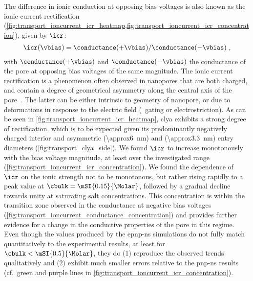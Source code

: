 The difference in ionic conduction at opposing bias voltages is also known as the ionic current rectification
(\cref{fig:transport_ioncurrent_icr_heatmap,fig:transport_ioncurrent_icr_concentration}), given by $\icr$:
%
\begin{align}\label{eq:icr}
  \icr(\vbias) = \conductance(+\vbias) / \conductance(-\vbias)
  \text{ ,}
\end{align}
%
with $\conductance(+\vbias)$ and $\conductance(-\vbias)$ the conductance of the pore at opposing bias voltages
of the same magnitude. The ionic current rectification is a phenomenon often observed in nanopores that are
both charged, and contain a degree of geometrical asymmetry along the central axis of the
pore~\cite{Constantin-2007,White-2008,Wang-2014}. The latter can be either intrinsic to geometry of nanopore,
or due to deformations in response to the electric field (\ie~gating or electrostriction). As can be seen in
\cref{fig:transport_ioncurrent_icr_heatmap}, \gls{clya} exhibits a strong degree of rectification, which is to
be expected given its predominantly negatively charged interior and asymmetric \cisi{} (\SI{\approx6}{\nm})
and \transi{} (\SI{\approx3.3}{\nm}) entry diameters (\cref{fig:transport_clya_side}). We found $\icr$ to
increase monotonously with the bias voltage magnitude, at least over the investigated range
(\cref{fig:transport_ioncurrent_icr_concentration}). We found the dependence of $\icr$ on the ionic strength
not to be monotonous, but rather rising rapidly to a peak value at $\cbulk=\mSI{0.15}{\Molar}$, followed by a
gradual decline towards unity at saturating salt concentrations. This concentration is within the transition
zone observed in the conductance at negative bias voltages
(\cref{fig:transport_ioncurrent_conductance_concentration}) and provides further evidence for a change in the
conductive properties of the pore in this regime. Even though the values produced by the \gls{epnp-ns}
simulations do not fully match quantitatively to the experimental results, at least for $\cbulk <
\text{\mSI{0.5}{\Molar}}$, they do (1) reproduce the observed trends qualitatively and (2) exhibit much
smaller errors relative to the \gls{pnp-ns} results (cf.~green and purple lines in
\cref{fig:transport_ioncurrent_icr_concentration}).

